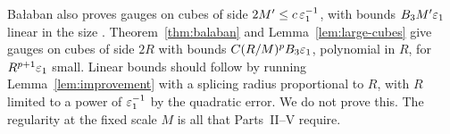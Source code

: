 \begin{remark}\label{rem:large-cubes}
Ba\l aban also proves gauges on cubes of side $2M'\le c\,\varepsilon_1^{-1}$, with bounds $B_3M'\varepsilon_1$ linear in the size \cite[(9), (10)]{BalVar}. Theorem~\ref{thm:balaban} and Lemma~\ref{lem:large-cubes} give gauges on cubes of side $2R$ with bounds $C(R/M)^pB_3\varepsilon_1$, polynomial in $R$, for $R^{p+1}\varepsilon_1$ small. Linear bounds should follow by running Lemma~\ref{lem:improvement} with a splicing radius proportional to $R$, with $R$ limited to a power of $\varepsilon_1^{-1}$ by the quadratic error. We do not prove this. The regularity at the fixed scale $M$ is all that Parts~II--V require.
\end{remark}
